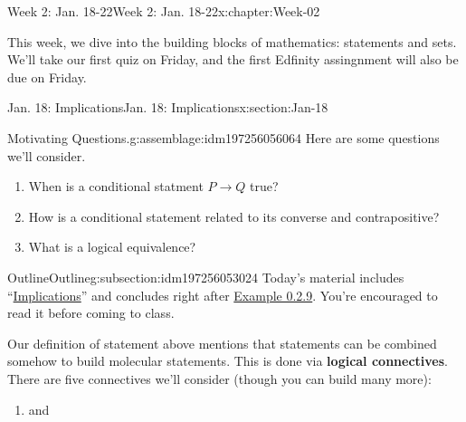 \documentclass[oneside,10pt,]{book}
\newcommand{\terminology}[1]{\textbf{#1}}
\numberwithin{equation}{section}
\begin{document}
%
%
\typeout{************************************************}
\typeout{************************************************}
%
\begin{chapterptx}{Week 2: Jan. 18-22}{}{Week 2: Jan. 18-22}{}{}{x:chapter:Week-02}
\begin{introduction}{}%
This week, we dive into the building blocks of mathematics: statements and sets. We'll take our first quiz on Friday, and the first Edfinity assingnment will also be due on Friday.%
\end{introduction}%
%
%
\typeout{************************************************}
\typeout{************************************************}
%
\begin{sectionptx}{Jan. 18: Implications}{}{Jan. 18: Implications}{}{}{x:section:Jan-18}
\begin{introduction}{}%
\begin{assemblage}{Motivating Questions.}{g:assemblage:idm197256056064}%
Here are some questions we'll consider. %
\begin{enumerate}
\item{}When is a conditional statment \(P\to Q\) true?%
\item{}How is a conditional statement related to its converse and contrapositive?%
\item{}What is a logical equivalence?%
\end{enumerate}
%
\end{assemblage}
\end{introduction}%
%
%
\typeout{************************************************}
\typeout{************************************************}
%
\begin{subsectionptx}{Outline}{}{Outline}{}{}{g:subsection:idm197256053024}
Today's material includes ``\href{http://discrete.openmathbooks.org/dmoi3/sec_intro-statements.html\#cRv}{Implications}'' and concludes right after \href{http://discrete.openmathbooks.org/dmoi3/sec_intro-statements.html\#vET}{Example 0.2.9}. You're encouraged to read it before coming to class.%
\par
Our definition of statement above mentions that statements can be combined somehow to build molecular statements. This is done via \terminology{logical connectives}. There are five connectives we'll consider (though you can build many more):%
%
\begin{enumerate}
\item{}and%

\end{enumerate}
\end{subsectionptx}
\end{sectionptx}
\end{chapterptx}
\end{document}
